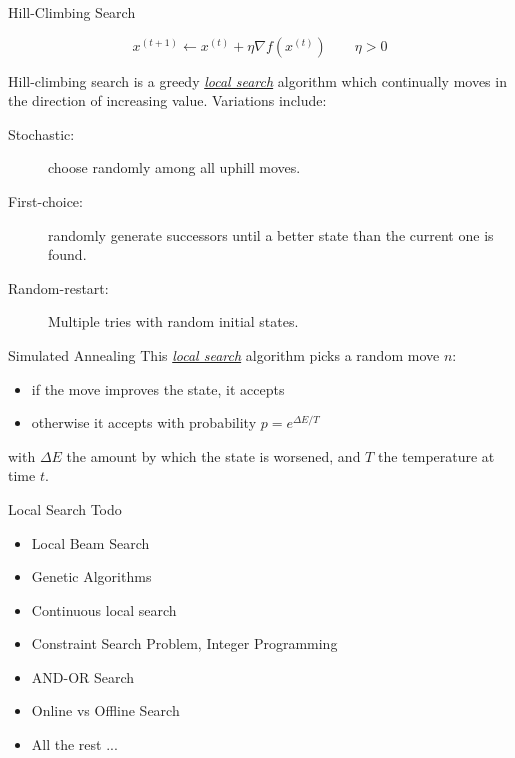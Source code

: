 \documentclass{cognito}
\begin{document}
\begin{note}{Hill-Climbing Search}
	\begin{mdframed}[linecolor=black!25!white]
		$$
			x^{(t+1)} \leftarrow x^{(t)} + \eta \nabla f(x^{(t)})
			\quad\quad \eta > 0
		$$
	\end{mdframed}
	Hill-climbing search is a greedy \hyperref[note:Optimization and Local Search]{\it local search} algorithm which continually moves in the
	direction of increasing value. Variations include:
	\begin{description}
		\item[Stochastic:] choose randomly among all uphill moves.
		\item[First-choice:] randomly generate successors until a better state than the current one is found.
		\item[Random-restart:] Multiple tries with random initial states.
	\end{description}
	\vspace{-5pt}
\end{note}

\begin{note}{Simulated Annealing}
	This \hyperref[note:Optimization and Local Search]{\it local search} algorithm picks a random move $n$:
	\begin{mdframed}[linecolor=black!25!white]
	\begin{itemize}
		\item if the move improves the state, it accepts
		\item otherwise it accepts with probability $p = e^{\Delta E / T}$
	\end{itemize}
	\end{mdframed}
	with $\Delta E$ the amount by which the state is worsened,
	and $T$ the temperature at time $t$.
\end{note}

\begin{answer}{Local Search Todo}
	\begin{itemize}
		\item Local Beam Search
		\item Genetic Algorithms
		\item Continuous local search
		\item Constraint Search Problem, Integer Programming
		\item AND-OR Search
		\item Online vs Offline Search
		\item All the rest ...
	\end{itemize}
\end{answer}
\end{document}

